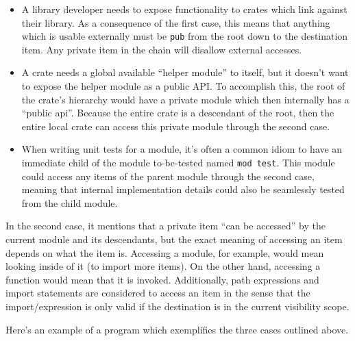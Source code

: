\documentclass[]{article}
\begin{document}
\begin{itemize}
\item
  A library developer needs to expose functionality to crates which link
  against their library. As a consequence of the first case, this means
  that anything which is usable externally must be \texttt{pub} from the
  root down to the destination item. Any private item in the chain will
  disallow external accesses.
\item
  A crate needs a global available ``helper module'' to itself, but it
  doesn't want to expose the helper module as a public API. To
  accomplish this, the root of the crate's hierarchy would have a
  private module which then internally has a ``public api''. Because the
  entire crate is a descendant of the root, then the entire local crate
  can access this private module through the second case.
\item
  When writing unit tests for a module, it's often a common idiom to
  have an immediate child of the module to-be-tested named
  \texttt{mod test}. This module could access any items of the parent
  module through the second case, meaning that internal implementation
  details could also be seamlessly tested from the child module.
\end{itemize}

In the second case, it mentions that a private item ``can be accessed''
by the current module and its descendants, but the exact meaning of
accessing an item depends on what the item is. Accessing a module, for
example, would mean looking inside of it (to import more items). On the
other hand, accessing a function would mean that it is invoked.
Additionally, path expressions and import statements are considered to
access an item in the sense that the import/expression is only valid if
the destination is in the current visibility scope.

Here's an example of a program which exemplifies the three cases
outlined above.
\end{document}
